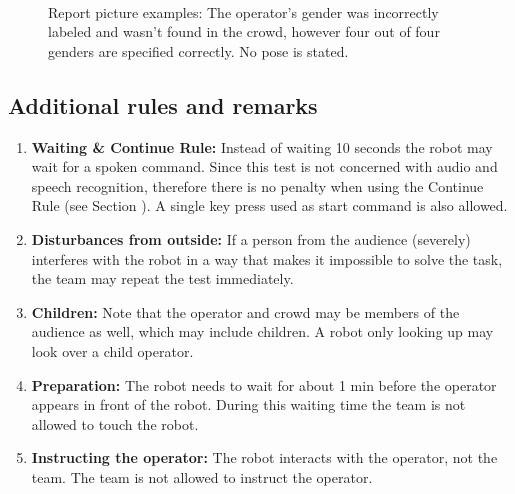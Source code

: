 \begin{figure}[tbp]
  \centering
   ~ 
  \caption{Report picture examples: The operator's gender was incorrectly labeled and wasn't found in the crowd, however four out of four genders are specified correctly. No pose is stated.}
  \label{fig:person_recognition}
\end{figure}

\subsection{Additional rules and remarks}
\begin{enumerate}
\item \textbf{Waiting \& Continue Rule:} Instead of waiting 10 seconds the robot may wait for a spoken command. Since this test is not concerned with audio and speech recognition, therefore there is no penalty when using the Continue Rule (see Section ). A single key press used as start command is also allowed.
\item \textbf{Disturbances from outside:} If a person from the audience (severely) interferes with the robot in a way that makes it impossible to solve the task, the team may repeat the test immediately.
\item \textbf{Children:} Note that the operator and crowd may be members of the audience as well, which may include children. A robot only looking up may look over a child operator. 
\item \textbf{Preparation:} The robot needs to wait for about 1 min before the operator appears in front of the robot. During this waiting time the team is not allowed to touch the robot.
\item \textbf{Instructing the operator:} The robot interacts with the operator, not the team. The team is not allowed to instruct the operator.
\end{enumerate}


